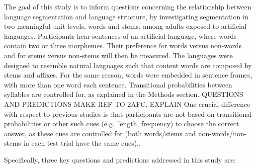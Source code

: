 \documentclass[
  american,
  ,man,floatsintext]{apa6}
\begin{document}
The goal of this study is to inform questions concerning the relationship between language segmentation and language structure, by investigating segmentation in two meaningful unit levels, words and stems, among adults exposed to artificial languages. Participants hear sentences of an artificial language, where words contain two or three morphemes. Their preference for words versus non-words and for stems versus non-stems will then be measured. The languages were designed to resemble natural languages such that content words are composed by stems and affixes. For the same reason, words were embedded in sentence frames, with more than one word each sentence. Transitional probabilities between syllables are controlled for, as explained in the Methods section. QUESTIONS AND PREDICTIONS MAKE REF TO 2AFC, EXPLAIN One crucial difference with respect to previous studies is that participants are not based on transitional probabilities or other such cues (e.g.~length, frequency) to choose the correct answer, as these cues are controlled for (both words/stems and non-words/non-stems in each test trial have the same cues)..

Specifically, three key questions and predictions addressed in this study are:
\end{document}
